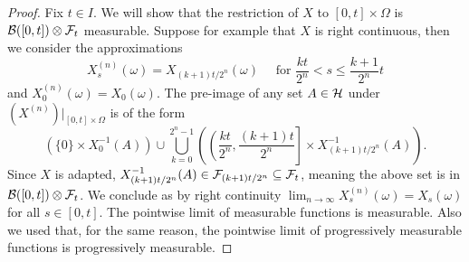 \documentclass[
    a4paper,
    DIV=14,
    abstract=true,
    numbers=noenddot
]{scrartcl}
\begin{document}
\begin{proof}
	Fix $t \in I$. We will show that the restriction of $X$ to $[0,t]\times\Omega$ is $\mathcal{B}([0,t])\otimes\mathcal{F}_t$ measurable. Suppose for example that $X$ is right continuous, then we consider the approximations
	\begin{equation*}
		X_{s}^{(n)}(\omega)=X_{(k+1)t / 2^{n}}(\omega) \quad \text{ for } \frac{k t}{2^{n}}<s \leq \frac{k+1}{2^{n}} t
	\end{equation*}
	and $X_0^{(n)}(\omega) = X_0(\omega)$. 
	The pre-image of any set $A\in\mathcal{H}$ under $(X^{(n)})|_{[0,t]\times \Omega}$ is of the form
	\begin{equation*}
		\left(\{0\}\times X_0^{-1}(A)\right) \cup \bigcup_{k=0}^{2^n-1}\left(\left(\frac{k t}{2^n},\frac{(k+1) t}{2^n}\right]\times X_{(k+1)t/2^n}^{-1}(A)\right).
	\end{equation*}
	Since $X$ is adapted, $X_{(k+1)t/2^n}^{-1}(A) \in \mathcal{F}_{(k+1)t/2^n} \subseteq \mathcal{F}_t$, meaning the above set is in $\mathcal{B}([0,t])\otimes\mathcal{F}_t$. We conclude as by right continuity $\lim_{n \to \infty}X_{s}^{(n)}(\omega)=X_s(\omega)$ for all $s \in [0,t]$. The pointwise limit of measurable functions is measurable. Also we used that, for the same reason, the pointwise limit of progressively measurable functions is progressively measurable.
\end{proof}
\end{document}
